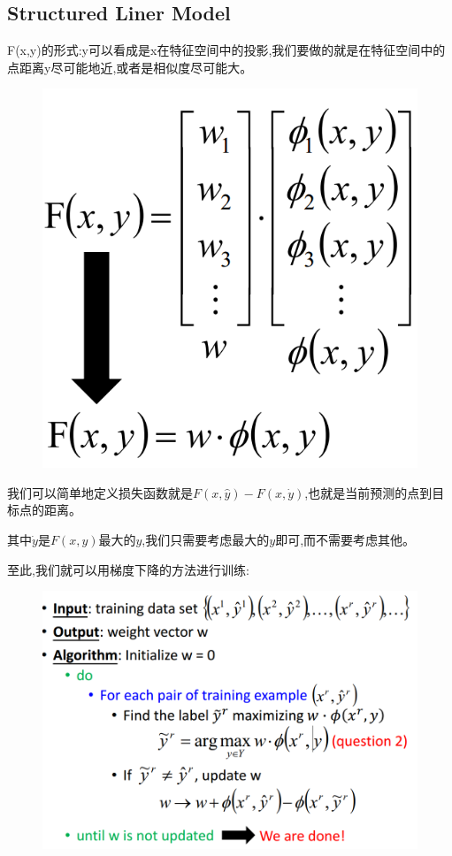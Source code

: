 \documentclass[UTF8,a4paper]{ctexart}
\begin{document}
        \subsection{Structured Liner Model}
        F(x,y)的形式:y可以看成是x在特征空间中的投影,我们要做的就是在特征空间中的点距离y尽可能地近,或者是相似度尽可能大。
        \begin{figure}[H]
            \centering
            \includegraphics[scale = 0.3]{assets/ML_eca3e.png}
        \end{figure}

        我们可以简单地定义损失函数就是$F(x,\hat{y}) - F(x,\dot y)$,也就是当前预测的点到目标点的距离。

        其中$\dot y$是$F(x,y)$最大的$y$,我们只需要考虑最大的$y$即可,而不需要考虑其他。

        至此,我们就可以用梯度下降的方法进行训练:
        \begin{figure}[H]
            \centering
            \includegraphics[scale = 0.3]{assets/ML_7db22.png}
        \end{figure}
\end{document}

